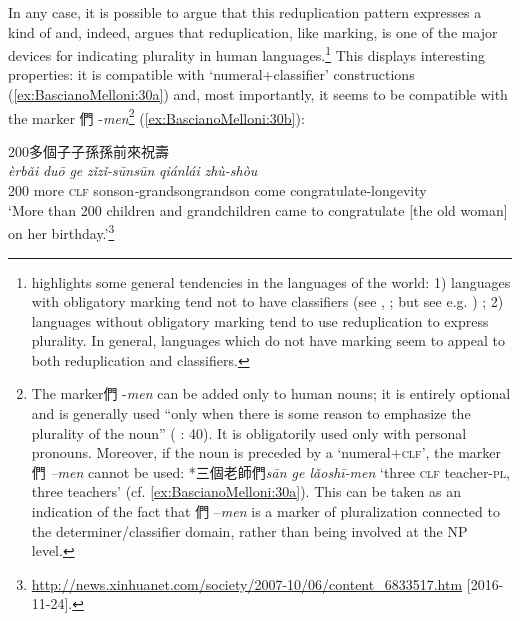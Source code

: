 \documentclass[output=paper]{langsci/langscibook}
\begin{document}
In any case, it is possible to argue that this reduplication pattern
expresses a kind of  and, indeed, %
\citet{Xu2012a} %
%
argues that
reduplication, like  marking, is one of the major devices for
indicating plurality in human languages.\footnote{
\citet[48]{Xu2012} %
%
  highlights some general tendencies in the languages of the world: 1)
  languages with obligatory  marking tend not to have classifiers
(see \citealt{Greenberg1972}, \citealt{SanchesSlobin1973}; but see e.g. \citealt{Bisang2012})%
%
; 2)
  languages without obligatory  marking tend to use reduplication
  to express plurality. In general, languages which do not have 
  marking seem to appeal to both reduplication and classifiers.} This
 displays interesting properties: it is compatible with
`numeral+classifier' constructions (\ref{ex:BascianoMelloni:30a}) and, most importantly, it seems
to be compatible with the  marker 們 -\emph{men}\footnote{The
   marker們 -\emph{men} can be added only to human nouns; it is
  entirely optional and is generally used ``only when there is some
  reason to emphasize the plurality of the noun'' (%
\citealt{Li1981}%
%
: 40). It is obligatorily used only with personal pronouns. Moreover, if
  the noun is preceded by a `numeral+\textsc{clf}', the marker 們
  \emph{--men} cannot be used: *三個老師們\emph{sān ge lǎoshī-men}
  `three \textsc{clf} teacher-\textsc{pl}, three teachers' (cf. \ref{ex:BascianoMelloni:30a}).
  This can be taken as an indication of the fact that 們 --\emph{men} is
  a marker of pluralization connected to the determiner/classifier
  domain, rather than being involved at the NP level.} (\ref{ex:BascianoMelloni:30b}):

\ea\label{ex:BascianoMelloni:30}
\ea\label{ex:BascianoMelloni:30a} 200多個子子孫孫前來祝壽\\
\gll \emph{èrbǎi} \emph{duō} \emph{ge} \emph{zǐ\tld{}zǐ-sūn\tld{}sūn} \emph{qiánlái} \emph{zhù-shòu}\\
200 more \textsc{clf} son\emph{\tld{}}son\emph{-}grandson\emph{\tld{}}grandson come congratulate-longevity\\
\glt  `More than 200 children and grandchildren came to congratulate {[}the
old woman{]} on her birthday.'\footnote{\url{http://news.xinhuanet.com/society/2007-10/06/content\_6833517.htm}  [2016-11-24].}
\end{document}
